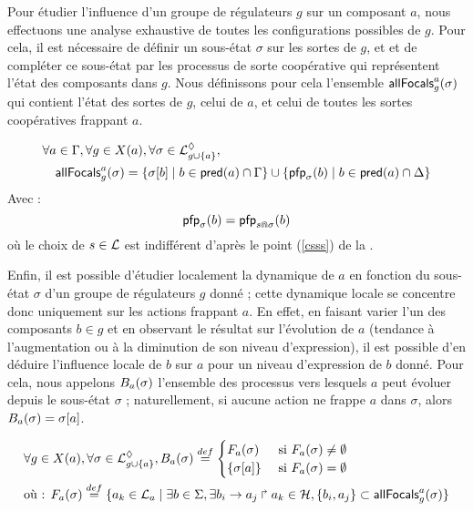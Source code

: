Pour étudier l'influence d'un groupe de régulateurs $g$ sur un composant $a$,
nous effectuons une analyse exhaustive de toutes les configurations possibles de $g$.
Pour cela, il est nécessaire de définir un sous-état $\sigma$ sur les sortes de $g$,
et et de compléter ce sous-état par les processus de sorte coopérative
qui représentent l'état des composants dans $g$.
Nous définissons pour cela l'ensemble $\mathsf{allFocals}^{a}_{g}(\sigma)$
qui contient l'état des sortes de $g$, celui de $a$, et celui de toutes les sortes
coopératives frappant $a$.

\begin{align*}
  &\forall a \in \mathrm{\Gamma}, \forall g \in X(a), \forall \sigma \in \mathcal{L}^\lozenge_{g \cup \{ a \}}, \\
  & \quad
  \mathsf{allFocals}^{a}_{g}(\sigma) = \{ {\sigma[b]} \mid b \in \mathsf{pred}(a) \cap \mathrm{\Gamma} \}
  \cup \{ \mathsf{pfp}_\sigma(b) \mid b \in \mathsf{pred}(a) \cap \Delta \}
\end{align*}
Avec :
\[
  \mathsf{pfp}_\sigma(b) = \mathsf{pfp}_{s \Cap \sigma}(b)
\]
où le choix de $s \in \mathcal{L}$ est indifférent d'après le point (\ref{csss}) de la .

Enfin, il est possible d'étudier localement la dynamique de $a$ en fonction du sous-état
$\sigma$ d'un groupe de régulateurs $g$ donné ;
cette dynamique locale se concentre donc uniquement sur les actions frappant $a$.
En effet, en faisant varier l'un des composants $b \in g$ et en observant le résultat
sur l'évolution de $a$ (tendance à l'augmentation ou à la diminution de son niveau d'expression),
il est possible d'en déduire l'influence locale de $b$ sur $a$ pour un niveau d'expression
de $b$ donné.
Pour cela, nous appelons $B_a(\sigma)$ l'ensemble des processus vers lesquels $a$ peut évoluer
depuis le sous-état $\sigma$ ;
naturellement, si aucune action ne frappe $a$ dans $\sigma$,
alors $B_a(\sigma) = {\sigma[a]}$.

\begin{align*}
  &\forall g \in X(a), \forall \sigma \in \mathcal{L}^\lozenge_{g \cup \{ a \}},
  B_a(\sigma) \stackrel{def}= 
  \begin{cases}
    F_a(\sigma)
      & \text{ si } F_a(\sigma) \neq \emptyset\\
    \{ {\sigma[a]} \}
      & \text{ si } F_a(\sigma) = \emptyset
  \end{cases}\\
  &\text{où : } F_a(\sigma) \stackrel{def}= \{ a_k \in \mathcal{L}_a \mid
    \exists b \in \Sigma, \exists b_i\rightarrow a_j\Rsh a_k \in \mathcal{H},
  \{ b_i, a_j \} \subset \mathsf{allFocals}^{a}_{g}(\sigma) \}\\
\end{align*}


